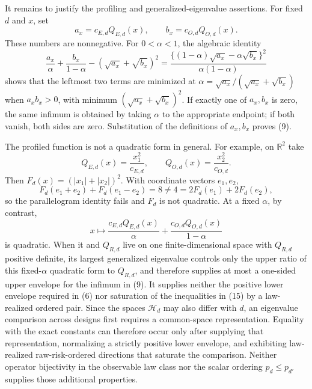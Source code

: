 It remains to justify the profiling and generalized-eigenvalue assertions.  For fixed \(d\) and \(x\), set
\[
  a_x=c_{E,d}Q_{E,d}(x),
  \qquad b_x=c_{O,d}Q_{O,d}(x).
\]
These numbers are nonnegative.  For \(0<\alpha<1\), the algebraic identity
\[
 \frac{a_x}{\alpha}+\frac{b_x}{1-\alpha}
 -(\sqrt{a_x}+\sqrt{b_x})^2
 =\frac{\{(1-\alpha)\sqrt{a_x}-\alpha\sqrt{b_x}\}^2}
        {\alpha(1-\alpha)}                                  \tag{16}
\]
shows that the leftmost two terms are minimized at
\(
\alpha=\sqrt{a_x}/(\sqrt{a_x}+\sqrt{b_x})
\)
when \(a_xb_x>0\), with minimum \((\sqrt{a_x}+\sqrt{b_x})^2\).  If exactly one of \(a_x,b_x\) is zero, the same infimum is obtained by taking \(\alpha\) to the appropriate endpoint; if both vanish, both sides are zero.  Substitution of the definitions of \(a_x,b_x\) proves (9).

The profiled function is not a quadratic form in general.  For example, on \(\mathbb R^2\) take
\[
  Q_{E,d}(x)=\frac{x_1^2}{c_{E,d}},
  \qquad
  Q_{O,d}(x)=\frac{x_2^2}{c_{O,d}}.
\]
Then \(F_d(x)=(|x_1|+|x_2|)^2\).  With coordinate vectors \(e_1,e_2\),
\[
 F_d(e_1+e_2)+F_d(e_1-e_2)=8
 \ne4=2F_d(e_1)+2F_d(e_2),                                 \tag{17}
\]
so the parallelogram identity fails and \(F_d\) is not quadratic.  At a fixed \(\alpha\), by contrast,
\[
 x\longmapsto
 \frac{c_{E,d}Q_{E,d}(x)}{\alpha}
 +\frac{c_{O,d}Q_{O,d}(x)}{1-\alpha}
\]
is quadratic.  When it and \(Q_{R,d}\) live on one finite-dimensional space with \(Q_{R,d}\) positive definite, its largest generalized eigenvalue controls only the upper ratio of this fixed-\(\alpha\) quadratic form to \(Q_{R,d}\), and therefore supplies at most a one-sided upper envelope for the infimum in (9).  It supplies neither the positive lower envelope required in (6) nor saturation of the inequalities in (15) by a law-realized ordered pair.  Since the spaces \(\mathcal H_d\) may also differ with \(d\), an eigenvalue comparison across designs first requires a common-space representation.  Equality with the exact constants can therefore occur only after supplying that representation, normalizing a strictly positive lower envelope, and exhibiting law-realized raw-risk-ordered directions that saturate the comparison.  Neither operator bijectivity in the observable law class nor the scalar ordering \(p_d\le p_{d'}\) supplies those additional properties.